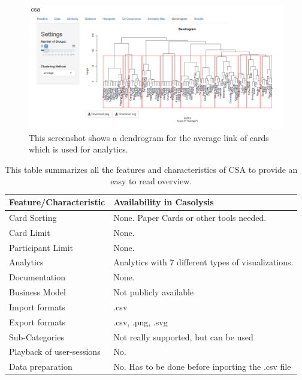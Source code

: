 \begin{figure}[tp] 
\centering
\includegraphics[keepaspectratio,width=\linewidth,height=\halfh]{images/csa-dendrogram.png}
\caption[CSA Dendrogram] { This screenshot shows a dendrogram 
for the average link of cards which is used for analytics.
}
\label{fig:CSA3}
\end{figure}

\begin{table}[tp]
\centering
\begin{tabularx}
{\linewidth}{|l|X|}
\hline \textbf{Feature/Characteristic} & \textbf{Availability in Casolysis} \\ 
\hline Card Sorting & None. Paper Cards or other tools needed. \\ 
\hline Card Limit & None. \\
\hline Participant Limit & None. \\
\hline Analytics & Analytics with 7 different types of visualizations. \\ 
\hline Documentation & None. \\
\hline Business Model & Not publicly available \\
\hline Import formats & .csv\\ 
\hline Export formats & .csv, .png, .svg \\ 
\hline Sub-Categories & Not really supported, but can be used \\ 
\hline Playback of user-sessions & No. \\ 
\hline Data preparation & No. Has to be done before inporting the .csv file \\ 
\hline
\end{tabularx} 
\caption[Feature summary of CSA] 
{ 
This table summarizes all the features and characteristics of CSA
to provide an easy to read overview.
}
\label{tab:features-CSA}
\end{table}



